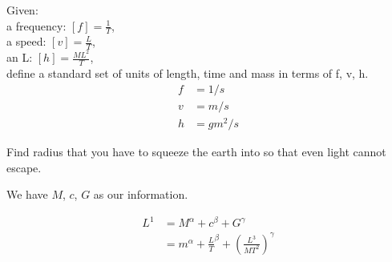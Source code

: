 \documentclass[11pt, notitlepage]{report}
\newenvironment{problem}[2][Problem]{\begin{trivlist}
	\item[\hskip \labelsep {\bfseries #1}\hskip \labelsep {\bfseries #2.}]}{\end{trivlist}}
\begin{document}
\begin{problem}{7}

	Given: \\
	a frequency: $[f] = \frac{1}{T}$, \\
	a speed: $[v] = \frac{L}{T}$, \\
	an L: $[h]=\frac{ML^2}{T}$, \\
	
	define a standard set of units of length, time and mass in terms of f, v, h.
	\begin{align*}
		f &= 1/s \\
		v &= m/s \\
		h &= gm^2/s
	\end{align*}

\end{problem}

\begin{problem}{8} 

Find radius that you have to squeeze the earth into so that even light cannot escape.

	We have $M$, $c$, $G$ as our information.
	
	\begin{align*}
		L^1 &= M^\alpha + c^\beta + G^\gamma \\
			&= m^\alpha + \frac{L}{T}^{\beta} + \left(\frac{L^3}{MT^2}\right)^\gamma 
	\end{align*}
\end{problem}
\end{document}
